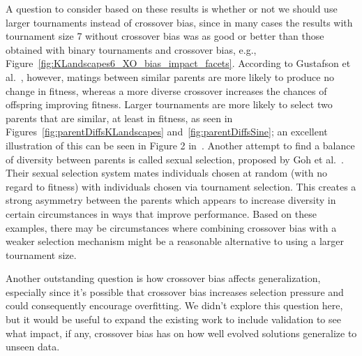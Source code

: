 \documentclass{sig-alternate}
\begin{document}
A question to consider based on these results is whether or not we should use larger tournaments instead of crossover bias, since in many cases the results with tournament size 7 without crossover bias was as good or better than those obtained with binary tournaments and crossover bias, e.g., Figure~\ref{fig:KLandscapes6_XO_bias_impact_facets}. 
According to Gustafson et al.~\cite{Gustafson:2005}, however, matings between similar parents are more likely 
to produce no change in fitness, whereas a more diverse crossover increases the chances of offspring 
improving fitness. Larger tournaments are more likely to select two parents that are similar, at 
least in fitness, as seen in Figures~\ref{fig:parentDiffsKLandscapes} and~\ref{fig:parentDiffsSine};
an excellent illustration of this can be seen in Figure 2 in~\cite{Boetticher:2006}. Another attempt to find a balance of 
diversity between parents is called sexual selection, proposed by Goh et al.~\cite{gohsexualselection}. Their sexual selection
system mates individuals chosen at random (with no regard to fitness) with individuals chosen via tournament selection.
This creates a strong asymmetry between the parents which appears to increase diversity in certain circumstances in ways
that improve performance. Based on these examples, 
there may be circumstances where combining crossover bias with a weaker selection mechanism might be a reasonable alternative to using a larger tournament size. 

Another outstanding question is how crossover bias affects generalization, especially since it's possible that crossover
bias increases selection pressure and could consequently encourage overfitting. We didn't explore this question here, but
it would be useful to expand the existing work to include validation to see what impact, if any,
crossover bias has on how well evolved solutions generalize to unseen data.
\end{document}
